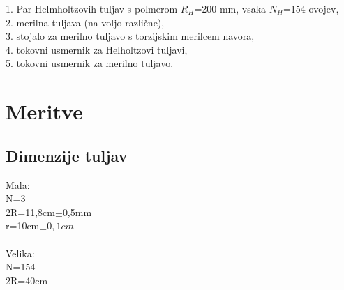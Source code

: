 \documentclass[a4paper]{report}
\begin{document}
1. Par Helmholtzovih tuljav s polmerom $R_H$=200 mm, vsaka $N_H$=154 ovojev,\\
2. merilna tuljava (na voljo različne),\\
3. stojalo za merilno tuljavo s torzijskim merilcem navora,\\
4. tokovni usmernik za Helholtzovi tuljavi,\\
5. tokovni usmernik za merilno tuljavo.

\chapter*{Meritve}
\section*{Dimenzije tuljav}
Mala:\\
N=3\\
2R=11,8cm$\pm$0,5mm\\
r=10cm$\pm0,1cm$\\
\\
Velika:\\
N=154\\
2R=40cm
\end{document}
